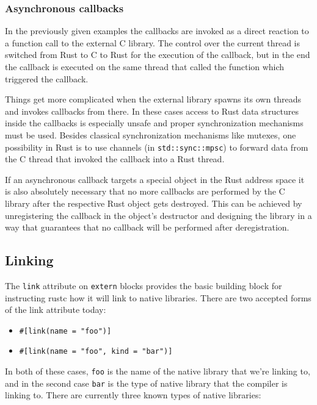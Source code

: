 \documentclass[a4paper,]{book}
\begin{document}
\subsubsection{Asynchronous callbacks}\label{asynchronous-callbacks}

In the previously given examples the callbacks are invoked as a direct
reaction to a function call to the external C library. The control over
the current thread is switched from Rust to C to Rust for the execution
of the callback, but in the end the callback is executed on the same
thread that called the function which triggered the callback.

Things get more complicated when the external library spawns its own
threads and invokes callbacks from there. In these cases access to Rust
data structures inside the callbacks is especially unsafe and proper
synchronization mechanisms must be used. Besides classical
synchronization mechanisms like mutexes, one possibility in Rust is to
use channels (in \texttt{std::sync::mpsc}) to forward data from the C
thread that invoked the callback into a Rust thread.

If an asynchronous callback targets a special object in the Rust address
space it is also absolutely necessary that no more callbacks are
performed by the C library after the respective Rust object gets
destroyed. This can be achieved by unregistering the callback in the
object's destructor and designing the library in a way that guarantees
that no callback will be performed after deregistration.

\subsection{Linking}\label{linking}

The \texttt{link} attribute on \texttt{extern} blocks provides the basic
building block for instructing rustc how it will link to native
libraries. There are two accepted forms of the link attribute today:

\begin{itemize}
\itemsep1pt\parskip0pt
\item
  \texttt{\#{[}link(name\ =\ "foo"){]}}
\item
  \texttt{\#{[}link(name\ =\ "foo",\ kind\ =\ "bar"){]}}
\end{itemize}

In both of these cases, \texttt{foo} is the name of the native library
that we're linking to, and in the second case \texttt{bar} is the type
of native library that the compiler is linking to. There are currently
three known types of native libraries:
\end{document}
